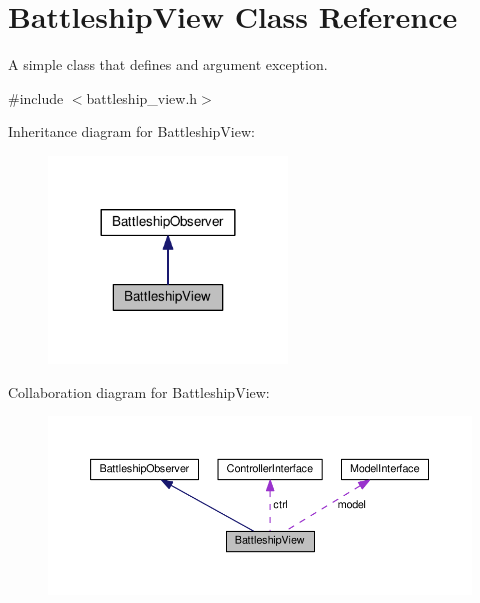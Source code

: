 \hypertarget{classGUI_1_1BattleshipView}{}\section{Battleship\+View Class Reference}
\label{classGUI_1_1BattleshipView}


A simple class that defines and argument exception.  




{\ttfamily \#include $<$battleship\+\_\+view.\+h$>$}



Inheritance diagram for Battleship\+View\+:\nopagebreak
\begin{figure}[H]
\begin{center}
\leavevmode
\includegraphics[width=180pt]{classGUI_1_1BattleshipView__inherit__graph}
\end{center}
\end{figure}


Collaboration diagram for Battleship\+View\+:\nopagebreak
\begin{figure}[H]
\begin{center}
\leavevmode
\includegraphics[width=350pt]{classGUI_1_1BattleshipView__coll__graph}
\end{center}
\end{figure}
